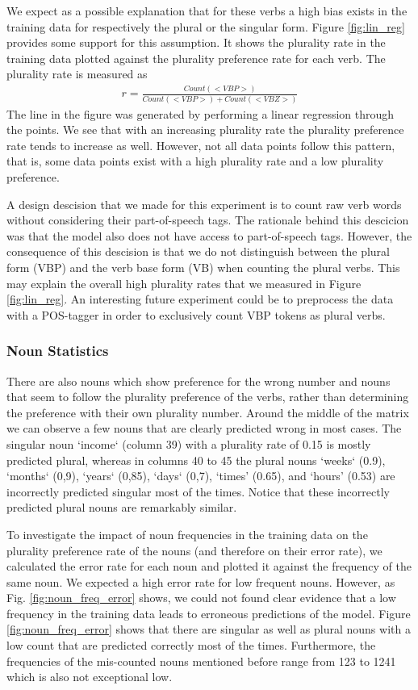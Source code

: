We expect as a possible explanation that for these verbs a high bias exists
in the training data for respectively the plural or the singular form.
Figure \ref{fig:lin_reg} provides some support for this assumption. It shows the plurality rate in the training data plotted against the plurality preference 
rate for each verb. 
The plurality rate is measured as
\begin{align*}
	r = \frac{Count(<VBP>)}{Count(<VBP>) + Count(<VBZ>)} 
\end{align*}
The line in the figure was generated by performing a linear regression through the points.
We see that with an increasing plurality rate the plurality preference rate tends to increase as well. 
However, not all data points follow this pattern,
that is, some data points exist with a high plurality rate and a
low plurality preference. 

A design descision that we made for this experiment is to
count raw verb words without considering their part-of-speech tags.
The rationale behind this descicion was that the model also
does not have access to part-of-speech tags.
However, the consequence of this descision is that
we do not distinguish between the plural form (VBP) 
and the verb base form (VB) when counting the plural verbs. 
This may explain the overall high plurality rates that 
we measured in Figure \ref{fig:lin_reg}.
An interesting future experiment could be  
to preprocess the data with a POS-tagger 
in order to exclusively count VBP tokens as plural verbs.

\subsubsection{Noun Statistics}

There are also nouns which show preference for the wrong number and nouns
that seem to follow the plurality preference of the verbs, 
rather than determining the preference with their own plurality number.
Around the middle of the matrix we can observe a few nouns that are clearly predicted wrong in most cases. The singular noun `income` (column 39) with a plurality rate of 0.15 is mostly predicted plural, whereas in columns 40 to 45 the plural nouns `weeks` (0.9), `months` (0,9), `years` (0,85), `days` (0,7), `times' (0.65), and `hours' (0.53) are incorrectly predicted singular most of the times. Notice that these incorrectly predicted
plural nouns are remarkably similar.

To investigate the impact of noun frequencies in the training data on the plurality 
preference rate of the nouns (and therefore on their error rate), 
we calculated the error rate for each noun and plotted it against the frequency of the same noun. 
We expected a high error rate for low frequent nouns. 
However, as Fig. \ref{fig:noun_freq_error} shows, we could not found clear evidence 
that a low frequency in the training data leads to erroneous predictions of the model. 
Figure \ref{fig:noun_freq_error} shows that there are singular as well as plural nouns 
with a low count that are predicted correctly most of the times.
Furthermore, the frequencies of the mis-counted nouns mentioned before
range from 123 to 1241 which is also not exceptional low.
 
